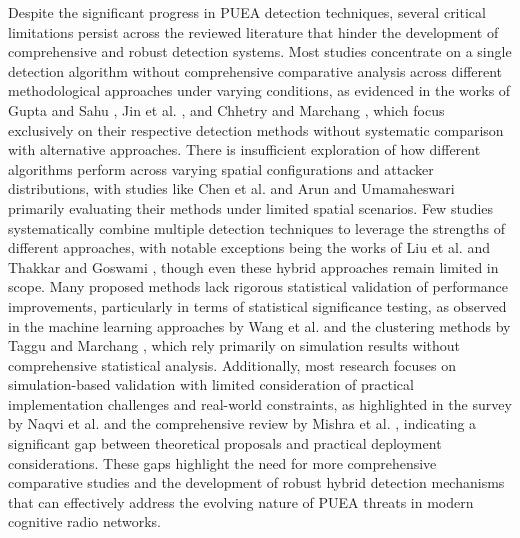 Despite the significant progress in PUEA detection techniques, several critical limitations persist across the reviewed literature that hinder the development of comprehensive and robust detection systems. Most studies concentrate on a single detection algorithm without comprehensive comparative analysis across different methodological approaches under varying conditions, as evidenced in the works of Gupta and Sahu \cite{ref1}, Jin et al. \cite{ref6}, and Chhetry and Marchang \cite{ref23}, which focus exclusively on their respective detection methods without systematic comparison with alternative approaches. There is insufficient exploration of how different algorithms perform across varying spatial configurations and attacker distributions, with studies like Chen et al. \cite{ref4} and Arun and Umamaheswari \cite{ref19} primarily evaluating their methods under limited spatial scenarios. Few studies systematically combine multiple detection techniques to leverage the strengths of different approaches, with notable exceptions being the works of Liu et al. \cite{ref5} and Thakkar and Goswami \cite{ref12}, though even these hybrid approaches remain limited in scope. Many proposed methods lack rigorous statistical validation of performance improvements, particularly in terms of statistical significance testing, as observed in the machine learning approaches by Wang et al. \cite{ref9} and the clustering methods by Taggu and Marchang \cite{ref21}, which rely primarily on simulation results without comprehensive statistical analysis. Additionally, most research focuses on simulation-based validation with limited consideration of practical implementation challenges and real-world constraints, as highlighted in the survey by Naqvi et al. \cite{ref7} and the comprehensive review by Mishra et al. \cite{ref24}, indicating a significant gap between theoretical proposals and practical deployment considerations. These gaps highlight the need for more comprehensive comparative studies and the development of robust hybrid detection mechanisms that can effectively address the evolving nature of PUEA threats in modern cognitive radio networks.




